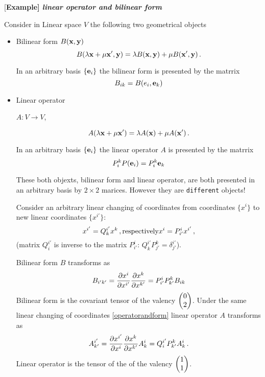 \documentclass[12pt]{article}
\theoremstyle{theorem}
\numberwithin{equation}{section}
\begin{document}
\medskip

{[\bf Example] \it linear operator and bilinear form}

  Consider in Linear space $V$ the following two geometrical objects

  \begin{itemize}

	  \item
		  
		  Bilinear form $B({\bf x},{\bf y})$
    $$
B(\lambda {\bf x}+\mu {\bf x}',{\bf y})=
\lambda B({\bf x},{\bf y})+
\mu B( {\bf x}',{\bf y})\,.
   $$

		  In an arbitrary  basis 
	$\{{\bf e}_i\}$ the bilinear form is presented by the matrrix
		    $$
		    B_{ik}=
		    B(e_i,{\bf e}_k)
		    $$
	  
	    \item Linear operator 
		    
		    $A\colon V\to V$,

		    $$
A(\lambda {\bf x}+\mu {\bf x}')=
\lambda A({\bf x})+
\mu A( {\bf x}')\,.
		    $$
		  
		  In an arbitrary  basis 
	$\{{\bf e}_i\}$ the linear operator  $A$
		  is presented by the matrrix
		    $$
		    P^k_i
		    P({\bf e}_i)=P_i^k{\bf e}_k
		    $$
 
These both objexts, bilinear form and linear operator,
		  are both presented in an arbitrary basis 
		  by $2\times 2$ marices. However they are 
		  {\tt different} objects!

		 Consider  an arbitrary linear changing of coordinates
		  from coordinates $\{x^i\}$ to new linear
		  coordinates $\{x^{i'}\}$:
		  \begin{equation}\label{operatorandform}
			  x^{i'}=Q^{i'}_kx^k\,,\hbox {respectively}
			  x^i=P^i_{i'}x^{i'}\,,
			  \end{equation}
		  (matrix $Q^{i'}_i$ is inverse to the matrix 
		$P^i_{i'}$: $Q^{i'}_kP^k_{j'}=
		  \delta^{i'}_{j'} $).

   Bilinear form $B$ transforms as
		      $$
		      B_{i'k'}=
		      {\partial x^i\over \partial x^{i'}}
		      {\partial x^k\over \partial x^{k'}}=
		      P^i_{i'} P^{k}_{k'}B_{ik}
		      $$
  Bilinear form is the covariant tensor of  the valency
		  $\begin{pmatrix} 0\cr 2\cr \end{pmatrix}$.
Under the  same linear changing of coordinates 
			  \eqref{operatorandform} 
   linear operator  $A$ transforms as
		      $$
		      A^{i'}_{k'}=
		      {\partial x^{i'}\over \partial x^{i}}
		      {\partial x^k\over \partial x^{k'}}A^i_k=
		      Q^{i'}_{i} P^{k}_{k'}A^i_k\,.
		      $$
  Linear operator is the  tensor of the of the valency
		  $\begin{pmatrix} 1\cr 1\cr \end{pmatrix}$.

\end{itemize}
\end{document}
